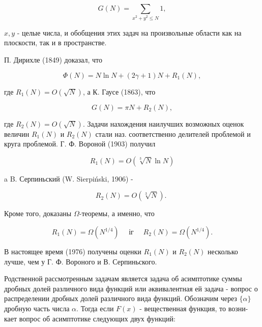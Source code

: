 \documentclass[10pt]{article}
\begin{document}
\[

G(N)=\sum_{x^{2}+y^{2} \leqslant N} 1,

\]



$x, y$ - целые числа, и обобщения этих задач на произвольные области как на плоскости, так и в пространстве.



П. Дирихле (1849) доказал, что



\[

\Phi(N)=N \ln N+(2 \gamma+1) N+R_{1}(N),

\]



где $R_{1}(N)=O(\sqrt{N})$, а К. Гаусе (1863), что



\[

G(N)=\pi N+R_{2}(N),

\]



где $R_{2}(N)=O(\sqrt{N})$. Задачи нахождения наилучших возможных оценок величин $R_{1}(N)$ и $R_{2}(N)$ стали наз. соответственно делителей проблемой и круга проблемой. Г. Ф. Вороной (1903) получил



\[

R_{1}(N)=O(\sqrt[3]{N} \ln N)

\]



a B. Серпиньский (W. Sierpiński, 1906) -



\[

R_{2}(N)=O(\sqrt[3]{N}) \text {. }

\]



Кроме того, доказаны $\Omega$-теоремы, а именно, что



\[

R_{1}(N)=\Omega\left(N^{1 / 4}\right) \quad \text { іг } \quad R_{2}(N)=\Omega\left(N^{1 / 4}\right) .

\]



В настоящее время (1976) получены оценки $R_{1}(N)$ и $R_{2}(N)$ несколько лучше, чем у $Г$. Ф. Вороного и В. Серпиньского.



Родственной рассмотренным задачам является задача об асимптотике суммы дробных долей различного вида функций или әквивалентная ей задача - вопрос о распределении дробных долей различного вида функций. Обозначим через $\{\alpha\}$ дробную часть числа $\alpha$. Тогда если $F(x)$ - вещественная функция, то возни- кает вопрос об асимптотике следующих двух функций:
\end{document}
